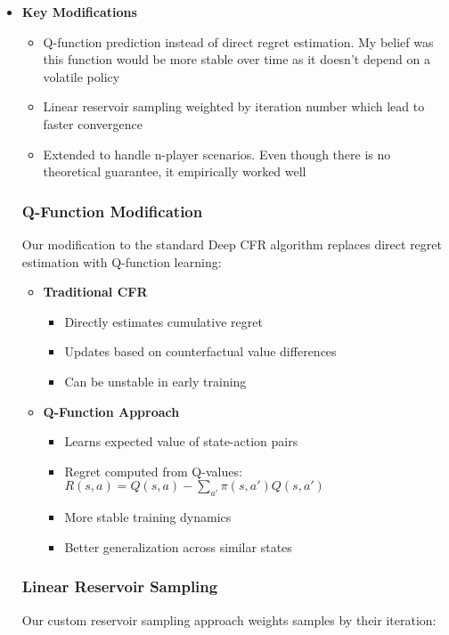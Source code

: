 \documentclass[11pt]{article}
\begin{document}
\begin{itemize}
    \item \textbf{Key Modifications}
    \begin{itemize}
        \item Q-function prediction instead of direct regret estimation. My belief was this function would be more stable over time as it doesn't depend on a volatile policy
        \item Linear reservoir sampling weighted by iteration number which lead to faster convergence
        \item Extended to handle n-player scenarios. Even though there is no theoretical guarantee, it empirically worked well
    \end{itemize}

    \subsubsection{Q-Function Modification}
    Our modification to the standard Deep CFR algorithm replaces direct regret estimation with Q-function learning:

    \begin{itemize}
        \item \textbf{Traditional CFR}
        \begin{itemize}
            \item Directly estimates cumulative regret
            \item Updates based on counterfactual value differences
            \item Can be unstable in early training
        \end{itemize}
        
        \item \textbf{Q-Function Approach}
        \begin{itemize}
            \item Learns expected value of state-action pairs
            \item Regret computed from Q-values: $R(s,a) = Q(s,a) - \sum_{a'} \pi(s,a') Q(s,a')$
            \item More stable training dynamics
            \item Better generalization across similar states
        \end{itemize}
    \end{itemize}

    \subsubsection{Linear Reservoir Sampling}
    Our custom reservoir sampling approach weights samples by their iteration:


\end{itemize}
\end{document}
